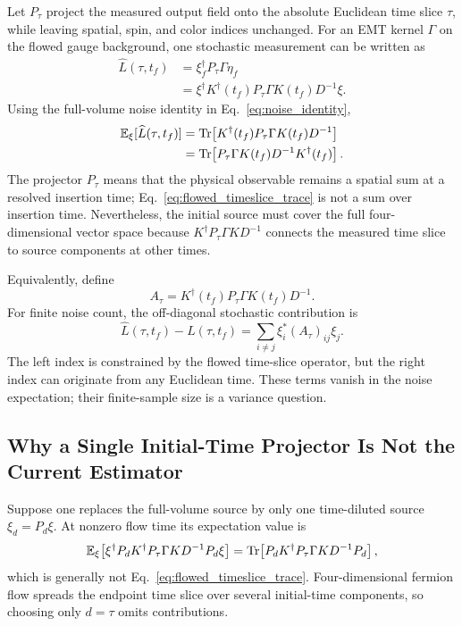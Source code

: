 \documentclass[11pt,a4paper]{article}
\newcommand{\Tf}{t_f}
\begin{document}
Let \(P_\tau\) project the measured output field onto the absolute Euclidean
time slice \(\tau\), while leaving spatial, spin, and color indices unchanged.
For an EMT kernel \(\Gamma\) on the flowed gauge background, one stochastic
measurement can be written as
\begin{align}
  \widehat L(\tau,\Tf)
  &=
  \xi_f^\dagger P_\tau\Gamma\eta_f
  \nonumber\\
  &=
  \xi^\dagger K^\dagger(\Tf)P_\tau\Gamma
  K(\Tf)D^{-1}\xi.
  \label{eq:flowed_timeslice_estimator}
\end{align}
Using the full-volume noise identity in Eq.~\eqref{eq:noise_identity},
\begin{align}
  \mathbb{E}_\xi[\widehat L(\tau,\Tf)]
  &=
  \Tr\!\left[
    K^\dagger(\Tf)P_\tau\Gamma K(\Tf)D^{-1}
  \right]
  \nonumber\\
  &=
  \Tr\!\left[
    P_\tau\Gamma K(\Tf)D^{-1}K^\dagger(\Tf)
  \right].
  \label{eq:flowed_timeslice_trace}
\end{align}
The projector \(P_\tau\) means that the physical observable remains a spatial
sum at a resolved insertion time; Eq.~\eqref{eq:flowed_timeslice_trace} is not a
sum over insertion time.  Nevertheless, the initial source must cover the full
four-dimensional vector space because \(K^\dagger P_\tau\Gamma K D^{-1}\)
connects the measured time slice to source components at other times.

Equivalently, define
\begin{equation}
  A_\tau = K^\dagger(\Tf)P_\tau\Gamma K(\Tf)D^{-1}.
\end{equation}
For finite noise count, the off-diagonal stochastic contribution is
\begin{equation}
  \widehat L(\tau,\Tf)-L(\tau,\Tf)
  =
  \sum_{i\ne j}\xi_i^*(A_\tau)_{ij}\xi_j.
  \label{eq:flowed_timeslice_noise}
\end{equation}
The left index is constrained by the flowed time-slice operator, but the right
index can originate from any Euclidean time.  These terms vanish in the noise
expectation; their finite-sample size is a variance question.

\subsection{Why a Single Initial-Time Projector Is Not the Current Estimator}

Suppose one replaces the full-volume source by only one time-diluted source
\(\xi_d=P_d\xi\).  At nonzero flow time its expectation value is
\begin{equation}
  \mathbb{E}_\xi\!\left[
    \xi^\dagger P_d K^\dagger P_\tau\Gamma K D^{-1}P_d\xi
  \right]
  =
  \Tr\!\left[
    P_d K^\dagger P_\tau\Gamma K D^{-1}P_d
  \right],
  \label{eq:single_time_projector}
\end{equation}
which is generally not Eq.~\eqref{eq:flowed_timeslice_trace}.  Four-dimensional
fermion flow spreads the endpoint time slice over several initial-time
components, so choosing only \(d=\tau\) omits contributions.
\end{document}
